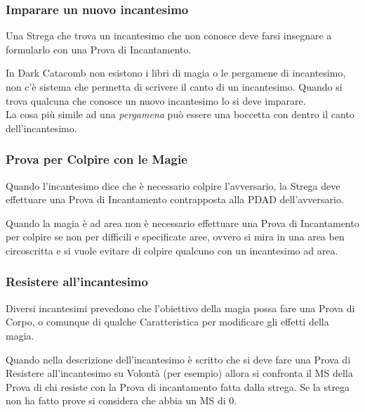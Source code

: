 \documentclass[12pt,a4paper,twoside,openany]{book}
\begin{document}
\begin{multicols}{2}
\subsubsection{Imparare un nuovo incantesimo}

Una Strega che trova un incantesimo che non conosce deve farsi insegnare a formularlo con una Prova di Incantamento.

\begin{narratore}
In Dark Catacomb non esistono i libri di magia o le pergamene di incantesimo, non c'è sistema che permetta di scrivere il canto di un incantesimo. Quando si trova qualcuna che conosce un nuovo incantesimo lo si deve imparare.\\
La cosa più simile ad una \textit{pergamena} può essere una boccetta con dentro il canto dell'incantesimo.
\end{narratore}

\subsubsection{Prova per Colpire con le Magie}\label{magietiropercolpireconlemagie}

Quando l'incantesimo dice che è necessario colpire l'avversario, la Strega deve effettuare una Prova di Incantamento contrapposta alla PDAD dell'avversario.

\medskip

Quando la magia è ad area non è necessario effettuare una Prova di Incantamento per colpire se non per difficili e specificate aree, ovvero si mira in una area ben circoscritta e si vuole evitare di colpire qualcuno con un incantesimo ad area.

\subsubsection{Resistere all'incantesimo}

Diversi incantesimi prevedono che l'obiettivo della magia possa fare una Prova di Corpo, o comunque di qualche Caratteristica per modificare gli effetti della magia.

Quando nella descrizione dell'incantesimo è scritto che si deve fare una Prova di Resistere all'incantesimo su Volontà (per esempio) allora si confronta il MS della Prova di chi resiste con la Prova di incantamento fatta dalla strega. Se la strega non ha fatto prove si considera che abbia un MS di 0.


\end{multicols}
\end{document}
